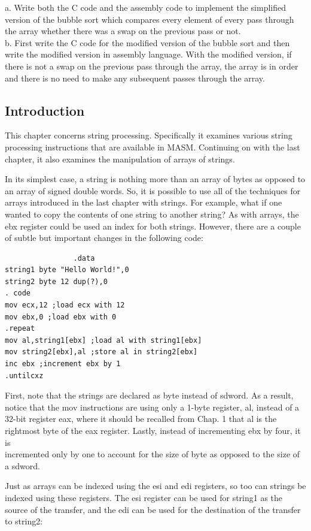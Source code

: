 \documentclass[10pt]{book}
\begin{document}
a. Write both the C code and the assembly code to implement the simplified version of the bubble sort which compares every element of every pass through the array whether there was a swap on the previous pass or not.\\
b. First write the C code for the modified version of the bubble sort and then write the modified version in assembly language. With the modified version, if there is not a swap on the previous pass through the array, the array is in order and there is no need to make any subsequent passes through the array.

\subsection{Introduction}
This chapter concerns string processing. Specifically it examines various string processing instructions that are available in MASM. Continuing on with the last chapter, it also examines the manipulation of arrays of strings.

In its simplest case, a string is nothing more than an array of bytes as opposed to an array of signed double words. So, it is possible to use all of the techniques for arrays introduced in the last chapter with strings. For example, what if one wanted to copy the contents of one string to another string? As with arrays, the ebx register could be used an index for both strings. However, there are a couple of subtle but important changes in the following code:

\begin{verbatim}
                .data
string1 byte "Hello World!",0
string2 byte 12 dup(?),0
. code
mov ecx,12 ;load ecx with 12
mov ebx,0 ;load ebx with 0
.repeat
mov al,string1[ebx] ;load al with string1[ebx]
mov string2[ebx],al ;store al in string2[ebx]
inc ebx ;increment ebx by 1
.untilcxz
\end{verbatim}

First, note that the strings are declared as byte instead of sdword. As a result, notice that the mov instructions are using only a 1-byte register, al, instead of a 32-bit register eax, where it should be recalled from Chap. 1 that al is the rightmost byte of the eax register. Lastly, instead of incrementing ebx by four, it is\\
incremented only by one to account for the size of byte as opposed to the size of a sdword.

Just as arrays can be indexed using the esi and edi registers, so too can strings be indexed using these registers. The esi register can be used for string1 as the source of the transfer, and the edi can be used for the destination of the transfer to string2:
\end{document}
